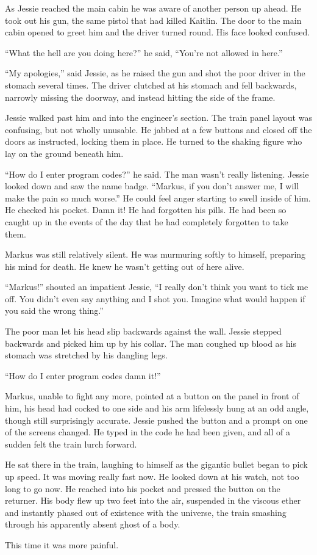 As Jessie reached the main cabin he was aware of another person up ahead.  He took out his gun, the same pistol that had killed Kaitlin.  The door to the main cabin opened to greet him and the driver turned round.  His face looked confused.

``What the hell are you doing here?'' he said, ``You're not allowed in here.''

``My apologies,'' said Jessie, as he raised the gun and shot the poor driver in the stomach several times.  The driver clutched at his stomach and fell backwards, narrowly missing the doorway, and instead hitting the side of the frame.

Jessie walked past him and into the engineer's section.  The train panel layout was confusing, but not wholly unusable.  He jabbed at a few buttons and closed off the doors as instructed, locking them in place.  He turned to the shaking figure who lay on the ground beneath him.  

``How do I enter program codes?'' he said.  The man wasn't really listening.  Jessie looked down and saw the name badge.  ``Markus, if you don't answer me, I will make the pain so much worse.''  He could feel anger starting to swell inside of him.  He checked his pocket.  Damn it!  He had forgotten his pills.  He had been so caught up in the events of the day that he had completely forgotten to take them.

Markus was still relatively silent.  He was murmuring softly to himself, preparing his mind for death.  He knew he wasn't getting out of here alive.  

``Markus!'' shouted an impatient Jessie, ``I really don't think you want to tick me off.  You didn't even say anything and I shot you.  Imagine what would happen if you said the wrong thing.''

The poor man let his head slip backwards against the wall.  Jessie stepped backwards and picked him up by his collar.  The man coughed up blood as his stomach was stretched by his dangling legs.  

``How do I enter program codes damn it!''

Markus, unable to fight any more, pointed at a button on the panel in front of him, his head had cocked to one side and his arm lifelessly hung at an odd angle, though still surprisingly accurate.  Jessie pushed the button and a prompt on one of the screens changed.  He typed in the code he had been given, and all of a sudden felt the train lurch forward.  

He sat there in the train, laughing to himself as the gigantic bullet began to pick up speed.  It was moving really fast now.  He looked down at his watch, not too long to go now.  He reached into his pocket and pressed the button on the returner.  His body flew up two feet into the air, suspended in the viscous ether and instantly phased out of existence with the universe, the train smashing through his apparently absent ghost of a body.

This time it was more painful.  



